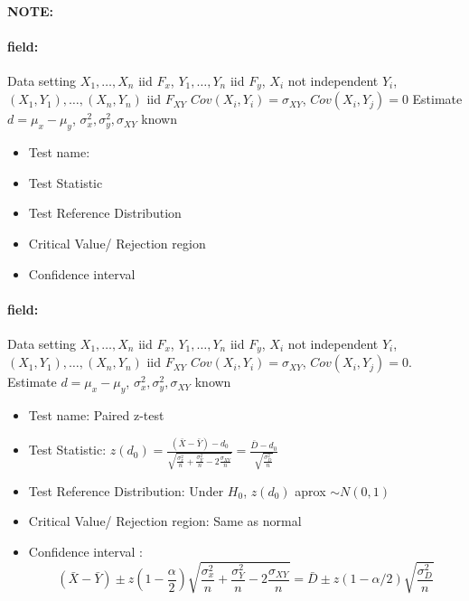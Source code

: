 \documentclass[12pt]{article}
\newenvironment{note}{\paragraph{NOTE:}}{}
\newenvironment{field}{\paragraph{field:}}{}
\begin{document}
\begin{note}
  \begin{field}
    Data setting $X_1, \ldots , X_n$ iid $F_x$, $Y_1, \ldots, Y_n$ iid $F_y$, $X_i$ not independent $Y_i$, $(X_1, Y_1), \ldots , (X_n,Y_n)$ iid $F_{XY}$ $Cov(X_i,Y_i) = \sigma_{XY}$, $Cov(X_i,Y_j) = 0$ Estimate $d = \mu_x - \mu_y$, $\sigma_x^2, \sigma_y^2, \sigma_{XY}$ known
    \begin{itemize}
      \item Test name:
      \item Test Statistic
      \item Test Reference Distribution
      \item Critical Value/ Rejection region
      \item Confidence interval
    \end{itemize}
  \end{field}
  \begin{field}
    Data setting $X_1, \ldots , X_n$ iid $F_x$, $Y_1, \ldots, Y_n$ iid $F_y$, $X_i$ not independent $Y_i$, $(X_1, Y_1), \ldots , (X_n,Y_n)$ iid $F_{XY}$ $Cov(X_i,Y_i) = \sigma_{XY}$, $Cov(X_i,Y_j) = 0$. Estimate $d = \mu_x - \mu_y$, $\sigma_x^2, \sigma_y^2, \sigma_{XY}$ known
    \begin{itemize}
      \item Test name: Paired z-test
      \item Test Statistic: $z(d_0) = \frac{(\bar{X} - \bar{Y}) - d_0}{\sqrt{\frac{\sigma_x^2}{n} + \frac{\sigma_Y^2}{n} - 2 \frac{\sigma_{XY}}{n}}} = \frac{\bar{D} - d_0}{\sqrt{\frac{\sigma_D^2}{n}}}$
      \item Test Reference Distribution: Under $H_0$, $z(d_0) $ aprox $\sim N(0,1)$
      \item Critical Value/ Rejection region: Same as normal
      \item Confidence interval : $$(\bar{X} - \bar{Y}) \pm z(1 - \frac{\alpha}{2})\sqrt{\frac{\sigma_x^2}{n} + \frac{\sigma_Y^2}{n} - 2 \frac{\sigma_{XY}}{n}} = \bar{D} \pm z(1 - \alpha/2) \sqrt{\frac{\sigma_D^2}{n}}$$
    \end{itemize}
  \end{field}
\end{note}
\end{document}
